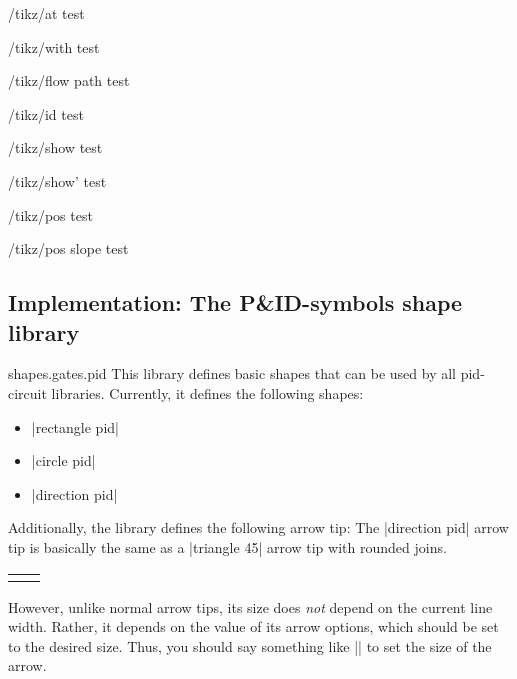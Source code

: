 \documentclass[a4paper]{ltxdoc}
\begin{document}
\begin{key}{/tikz/at}
	test
\end{key}

\begin{key}{/tikz/with}
	test
\end{key}

\begin{decoration}{/tikz/flow path}
	test
	\begin{key}{/tikz/id}
		test
	\end{key}

	\begin{key}{/tikz/show}
		test
	\end{key}

	\begin{key}{/tikz/show'}
		test
	\end{key}

	\begin{key}{/tikz/pos}
		test
	\end{key}

	\begin{key}{/tikz/pos slope}
		test
	\end{key}

\end{decoration}

\subsection{Implementation: The P\&ID-symbols shape library}
\begin{pgflibrary}{shapes.gates.pid}
	This library defines basic shapes that can be used by all pid-circuit
	libraries. Currently, it defines the following shapes:
	\begin{itemize}
		\item |rectangle pid|
		\item |circle pid|
		\item |direction pid|
	\end{itemize}
	Additionally, the library defines the following arrow tip:
	The |direction pid| arrow tip is basically the same as a |triangle 45|
	arrow tip with rounded joins.

	\begin{tabu}{l l}
	\end{tabu}

	However, unlike normal arrow tips, its size does \emph{not} depend on
	the current line width. Rather, it depends on the value of its
	arrow options, which should be set to the desired size. Thus, you
	should say something like || to
	set the size of the arrow.
\end{pgflibrary}
\end{document}
